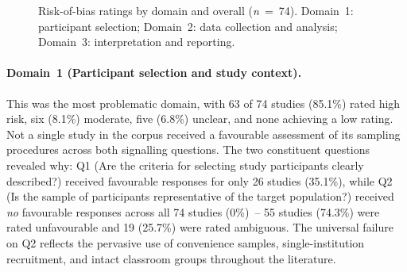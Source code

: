 \documentclass[etq]{acnsart}
\begin{document}
	\begin{figure}[ht]
		\centering
		\caption{Risk-of-bias ratings by domain and overall (\textit{n}~=~74). Domain~1: participant selection; Domain~2: data collection and analysis; Domain~3: interpretation and reporting.}
		\label{fig:rob_domains}
	\end{figure}
	
	\paragraph{Domain~1 (Participant selection and study context).} This was the most problematic domain, with 63 of 74 studies (85.1\%) rated high risk, six (8.1\%) moderate, five (6.8\%) unclear, and none achieving a low rating. Not a single study in the corpus received a favourable assessment of its sampling procedures across both signalling questions. The two constituent questions revealed why: Q1 (Are the criteria for selecting study participants clearly described?) received favourable responses for only 26 studies (35.1\%), while Q2 (Is the sample of participants representative of the target population?) received \emph{no} favourable responses across all 74 studies (0\%)~-- 55 studies (74.3\%) were rated unfavourable and 19 (25.7\%) were rated ambiguous. The universal failure on Q2 reflects the pervasive use of convenience samples, single-institution recruitment, and intact classroom groups throughout the literature.
	
\end{document}
